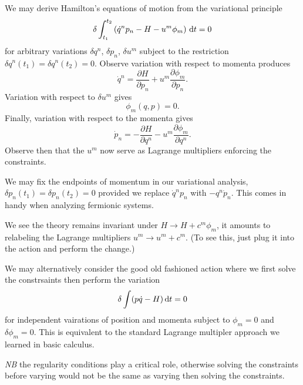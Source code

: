 We may derive Hamilton's equations of motion from the variational
principle
\begin{equation}
\delta\int^{t_{2}}_{t_{1}}\left(\dot{q}^{n}p_{n}-H-u^{m}\phi_{m}\right)\,\mathrm{d} t=0
\end{equation}
for arbitrary variations $\delta q^{n}$, $\delta p_{n}$, $\delta u^{m}$
subject to the restriction $\delta q^{n}(t_{1})=\delta q^{n}(t_{2})=0$.
Observe variation with respect to momenta produces
\begin{equation}
  \dot{q}^{n} = \frac{\partial H}{\partial p_{n}}
  +u^{m}\frac{\partial\phi_{m}}{\partial p_{n}}.
\end{equation}
Variation with respect to $\delta u^{m}$ gives
\begin{equation}
  \phi_{m}(q,p) = 0.
\end{equation}
Finally, variation with respect to the momenta gives
\begin{equation}
\dot{p}_{n} = -\frac{\partial H}{\partial q^{n}}
  -u^{m}\frac{\partial\phi_{m}}{\partial q^{n}}.
\end{equation}
Observe then that the $u^{m}$ now serve as Lagrange multipliers
enforcing the constraints.

We may fix the endpoints of momentum in our variational analysis,
$\delta p_{n}(t_{1})=\delta p_{n}(t_{2})=0$ provided we replace
$\dot{q}^{n}p_{n}$ with $-q^{n}\dot{p}_{n}$. This comes in handy when
analyzing fermionic systems.

\M
We see the theory remains invariant under $H\to H+c^{m}\phi_{m}$, it
amounts to relabeling the Lagrange multipliers $u^{m}\to
u^{m}+c^{m}$. (To see this, just plug it into the action and perform the
change.)

We may alternatively consider the good old fashioned action where we
first solve the constrsaints then perform the variation
\begin{equation}
\delta\int(p\dot{q}-H)\,\mathrm{d} t=0
\end{equation}
for independent vairations of position and momenta subject to
$\phi_{m}=0$ and $\delta\phi_{m}=0$. This is equivalent to the standard
Lagrange multipler approach we learned in basic calculus.

\emph{NB} the regularity conditions
play a critical role, otherwise solving the constraints before varying
would not be the same as varying then solving the constraints.


